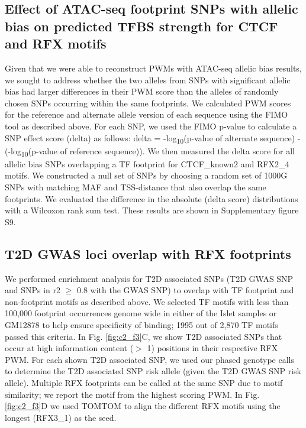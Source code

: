 \subsection{Effect of ATAC-seq footprint SNPs with allelic bias on predicted TFBS strength for CTCF and RFX motifs}
Given that we were able to reconstruct PWMs with ATAC-seq allelic bias results, we sought to address whether the two alleles from SNPs with significant allelic bias had larger differences in their PWM score than the alleles of randomly chosen SNPs occurring within the same footprints. We calculated PWM scores for the reference and alternate allele version of each sequence using the FIMO tool as described above. For each SNP, we used the FIMO p-value to calculate a SNP effect score (delta) as follows:  delta = -log\textsubscript{10}(p-value of alternate sequence) - (-log\textsubscript{10}(p-value of reference sequence)). We then measured the delta score for all allelic bias SNPs overlapping a TF footprint for CTCF\_known2 and RFX2\_4 motifs. We constructed a null set of SNPs by choosing a random set of 1000G SNPs with matching MAF and TSS-distance that also overlap the same footprints. We evaluated the difference in the absolute (delta score) distributions with a Wilcoxon rank sum test. These results are shown in Supplementary figure S9.

\subsection{T2D GWAS loci overlap with RFX footprints}
We performed enrichment analysis for T2D associated SNPs (T2D GWAS SNP and SNPs in r2 $\geq$ 0.8 with the GWAS SNP) to overlap with TF footprint and non-footprint motifs as described above. We selected TF motifs with less than 100,000 footprint occurrences genome wide in either of the Islet samples or GM12878 to help ensure specificity of binding; 1995 out of 2,870 TF motifs passed this criteria.  In Fig. \ref{fig:c2_f3}C, we show T2D associated SNPs that occur at high information content ($>$ 1) positions in their respective RFX PWM. For each shown T2D associated SNP, we used our phased genotype calls to determine the T2D associated SNP risk allele (given the T2D GWAS SNP risk allele). Multiple RFX footprints can be called at the same SNP due to motif similarity; we report the motif from the highest scoring PWM. In Fig. \ref{fig:c2_f3}D we used TOMTOM \cite{guptaQuantifyingSimilarityMotifs2007} to align the different RFX motifs using the longest (RFX3\_1) as the seed.


